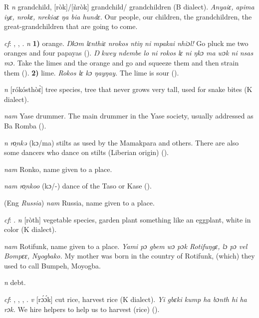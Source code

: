 \begin{letter}{R}
 \textit{n} grandchild, [ròk]/[ǹròk] grandchild/ grandchildren (B dialect). \textit{Anyaiɛ, apima iyɛ, nrokɛ, nrekiaɛ ŋa bia hundɛ.} Our people, our children, the grandchildren, the great-grandchildren that are going to come.

 \textit{cf}: , , . \textit{n} \textbf{1)} orange. \textit{Ŋkɔm lɛnthiɛ nrokos ntiŋ ni mpakai nhiɔl!} Go pluck me two oranges and four papayas (\citealt{Pichl1967}). \textit{Ŋ kwey ndembe lo ni rokos lɛ ni ŋkɔ ma wɔk ni nsas mɔ.} Take the limes and the orange and go and squeeze them and then strain them (\citealt{Pichl1967}). \textbf{2)} lime. \textit{Rokos lɛ kɔ ŋayŋay.} The lime is sour (\citealt{Pichl1967}). 

 \textit{n} [rókósthòɛ̀] tree species, tree that never grows very tall, used for snake bites (K dialect). 

 \textit{nam} Yase drummer. The main drummer in the Yase society, usually addressed as Ba Romba (\citealt{Pichl1967}). 

 \textit{n} \textit{ro̹nkə} (kɔ/ma) stilts as used by the Mamakpara and others. There are also some dancers who dance on stilts (Liberian origin) (\citealt{Pichl1967}). 

 \textit{nam} Ronko, name given to a place. 

 \textit{nam} \textit{ro̹nkoo} (kɔ/-) dance of the Taso or Kase (\citealt{Pichl1967}). 

 (Eng \textit{Russia}) \textit{nam} Russia, name given to a place. 

 \textit{cf}: . \textit{n} [ròth] vegetable species, garden plant something like an eggplant, white in color (K dialect). 

 \textit{nam} Rotifunk, name given to a place. \textit{Yami pɔ gbem wɔ pɔk Rotifuŋgɛ, lɔ pɔ vel Bompɛɛ, Nyogbako.} My mother was born in the country of Rotifunk, (which) they used to call Bumpeh, Moyogba.

 \textit{n} debt.

 \textit{cf}: , , , . \textit{v} [rɔ́ɔ́k] cut rice, harvest rice (K dialect). \textit{Yi gbɛki kump ha bɔnth hi ha rɔk.} We hire helpers to help us to harvest (rice) (\citealt{Pichl1967}). 


\end{letter}
